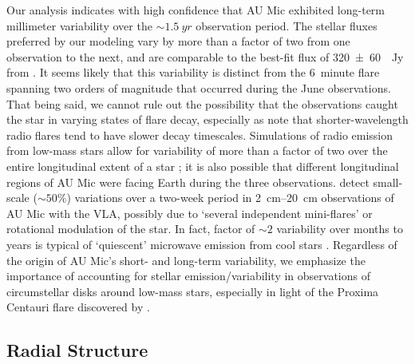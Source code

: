 \documentclass[modern]{aastex62}
\begin{document}
Our analysis indicates with high confidence that AU Mic exhibited long-term millimeter variability over the $\sim \SI{1.5}{yr}$ observation period. 
The stellar fluxes preferred by our modeling vary by more than a factor of two from one observation to the next, and are comparable to the best-fit flux of \SI{320 \pm 60}{\mu Jy} from \cite{macgregor13}.
It seems likely that this variability is distinct from the \SI{6}{minute} flare spanning two orders of magnitude that occurred during the June observations. 
That being said, we cannot rule out the possibility that the observations caught the star in varying states of flare decay, especially as \cite{white96} note that shorter-wavelength radio flares tend to have slower decay timescales.
Simulations of radio emission from low-mass stars allow for variability of more than a factor of two over the entire longitudinal extent of a star \citep{llama18}; it is also possible that different longitudinal regions of AU Mic were facing Earth during the three observations.
\cite{cox85} detect small-scale ($\sim 50\%$) variations over  a two-week period in \SIrange{2}{20}{cm} observations of AU Mic with the VLA, possibly due to `several independent mini-flares' or rotational modulation of the star.
In fact, factor of $\sim 2$ variability over months to years is typical of `quiescent' microwave emission from cool stars \citep{guedel94}.
Regardless of the origin of AU Mic's short- and long-term variability, we emphasize the importance of accounting for stellar emission/variability in observations of circumstellar disks around low-mass stars, especially in light of the Proxima Centauri flare discovered by \cite{macgregor18}.


\subsection{Radial Structure}
\label{subsection: radial discussion}
\end{document}

